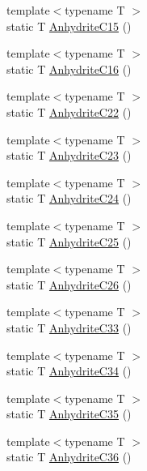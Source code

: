 \begin{DoxyCompactItemize}
\item 
{\footnotesize template$<$typename T $>$ }\\static T \mbox{\hyperlink{namespacempc_1_1data_a7c0f0d617fd45d9795c68cb1777bf53b}{Anhydrite\+C15}} ()
\item 
{\footnotesize template$<$typename T $>$ }\\static T \mbox{\hyperlink{namespacempc_1_1data_a39694b2f1f5be98cb54a2351a99c1337}{Anhydrite\+C16}} ()
\item 
{\footnotesize template$<$typename T $>$ }\\static T \mbox{\hyperlink{namespacempc_1_1data_a4e2511b4ba420a2d87c990d2014207ba}{Anhydrite\+C22}} ()
\item 
{\footnotesize template$<$typename T $>$ }\\static T \mbox{\hyperlink{namespacempc_1_1data_aaeb1ee0bec3852e05014590b2055d49e}{Anhydrite\+C23}} ()
\item 
{\footnotesize template$<$typename T $>$ }\\static T \mbox{\hyperlink{namespacempc_1_1data_a20976b2177d00b449d6963e942eea39d}{Anhydrite\+C24}} ()
\item 
{\footnotesize template$<$typename T $>$ }\\static T \mbox{\hyperlink{namespacempc_1_1data_af25c6e06b9e864df330bf8ea4546ad22}{Anhydrite\+C25}} ()
\item 
{\footnotesize template$<$typename T $>$ }\\static T \mbox{\hyperlink{namespacempc_1_1data_a3d04b179c84211be0425d76831d73f93}{Anhydrite\+C26}} ()
\item 
{\footnotesize template$<$typename T $>$ }\\static T \mbox{\hyperlink{namespacempc_1_1data_a477d4f3edb8c03f41e7e745801dea5a5}{Anhydrite\+C33}} ()
\item 
{\footnotesize template$<$typename T $>$ }\\static T \mbox{\hyperlink{namespacempc_1_1data_a02b0c9903ce1bb4edf1ea60b3520c30c}{Anhydrite\+C34}} ()
\item 
{\footnotesize template$<$typename T $>$ }\\static T \mbox{\hyperlink{namespacempc_1_1data_a94b371e4bcbd81ed88e9817c8d0241c1}{Anhydrite\+C35}} ()
\item 
{\footnotesize template$<$typename T $>$ }\\static T \mbox{\hyperlink{namespacempc_1_1data_a5689aef7869c2c2883121c1e838d8fd4}{Anhydrite\+C36}} ()
\item 

\end{DoxyCompactItemize}

